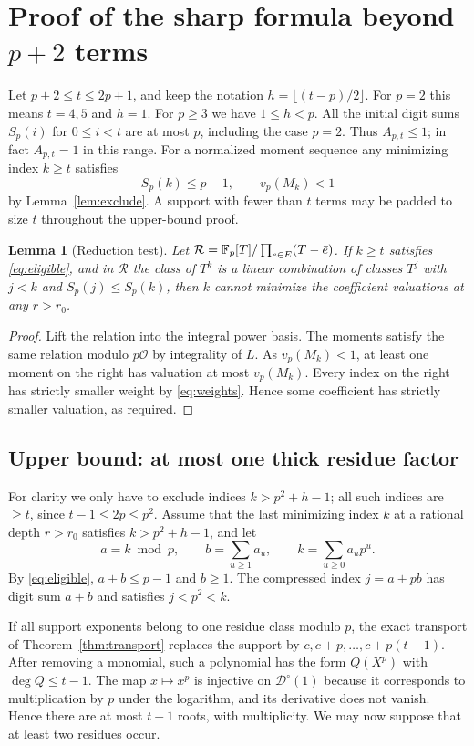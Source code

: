 \documentclass[11pt]{article}
\newtheorem{lemma}[theorem]{Lemma}
\theoremstyle{remark}\newtheorem{remark}[theorem]{Remark}
\newcommand{\vp}{v_p}\newcommand{\ord}{\operatorname{ord}}\newcommand{\spn}{\operatorname{span}}\newcommand{\res}{\operatorname{res}}
\newcommand{\D}{\mathcal D}\newcommand{\R}{\mathcal R}\newcommand{\Ocal}{\mathcal O}
\begin{document}
\section{Proof of the sharp formula beyond $p+2$ terms}

Let $p+2\le t\le2p+1$, and keep the notation $h=\lfloor(t-p)/2\rfloor$.
For $p=2$ this means $t=4,5$ and $h=1$. For $p\ge3$ we have $1\le h<p$.
All the initial digit sums $S_p(i)$ for $0\le i<t$ are at most $p$, including the
case $p=2$. Thus $A_{p,t}\le1$; in fact $A_{p,t}=1$ in this range. For a normalized
moment sequence any minimizing index $k\ge t$ satisfies
\begin{equation}\label{eq:eligible}
 S_p(k)\le p-1,\qquad \vp(M_k)<1
\end{equation}
by Lemma~\ref{lem:exclude}. A support with fewer than $t$ terms may be padded to size
$t$ throughout the upper-bound proof.

\begin{lemma}[Reduction test]\label{lem:reduction}
Let $\R=\F_p[T]/\prod_{e\in E}(T-\bar e)$. If $k\ge t$ satisfies
\eqref{eq:eligible}, and in $\R$ the class of $T^k$ is a linear combination of classes
$T^j$ with $j<k$ and $S_p(j)\le S_p(k)$, then $k$ cannot minimize the coefficient
valuations at any $r>r_0$.
\end{lemma}
\begin{proof}
Lift the relation into the integral power basis. The moments satisfy the same
relation modulo $p\Ocal$ by integrality of $L$. As $\vp(M_k)<1$, at least one moment
on the right has valuation at most $\vp(M_k)$. Every index on the right has
strictly smaller weight by \eqref{eq:weights}. Hence some coefficient has strictly
smaller valuation, as required.
\end{proof}

\subsection{Upper bound: at most one thick residue factor}

For clarity we only have to exclude indices $k>p^2+h-1$; all such indices are $\ge t$,
since $t-1\le2p\le p^2$. Assume that the last minimizing index $k$ at a rational depth $r>r_0$ satisfies $k>p^2+h-1$, and let
\[
 a=k\bmod p,\qquad b=\sum_{u\ge1}a_u,\qquad k=\sum_{u\ge0}a_up^u.
\]
By \eqref{eq:eligible}, $a+b\le p-1$ and $b\ge1$.
The compressed index $j=a+pb$ has digit sum $a+b$ and satisfies $j<p^2<k$.

If all support exponents belong to one residue class modulo $p$, the exact transport
of Theorem~\ref{thm:transport} replaces the support by $c,c+p,\ldots,c+p(t-1)$.
After removing a monomial, such a polynomial has the form $Q(X^p)$ with
$\deg Q\le t-1$. The map $x\mapsto x^p$ is injective on $\D^\circ(1)$ because it
corresponds to multiplication by $p$ under the logarithm, and its derivative does not
vanish. Hence there are at most $t-1$ roots, with multiplicity. We may now suppose
that at least two residues occur.
\end{document}
